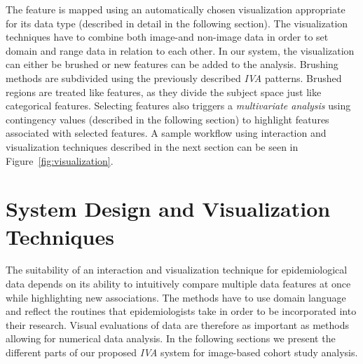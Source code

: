 \documentclass[journal]{style/vgtc} 			          %
\begin{document}
%
The feature is mapped using an automatically chosen visualization appropriate for its data type (described in detail in the following section).
%
The visualization techniques have to combine both image-and non-image data in order to set domain and range data in relation to each other.
%
In our system, the visualization can either be brushed or new features can be added to the analysis. 
%
Brushing methods are subdivided using the previously described \emph{IVA} patterns.
%
Brushed regions are treated like features, as they divide the subject space just like categorical features.
%
Selecting features also triggers a \emph{multivariate analysis} using contingency values (described in the following section) to highlight features associated with selected features.
%
A sample workflow using interaction and visualization techniques described in the next section can be seen in Figure~\ref{fig:visualization}.

\section{System Design and Visualization Techniques} \label{Interaction- and Visualization Techniques}
%
The suitability of an interaction and visualization technique for epidemiological data depends on its ability to intuitively compare multiple data features at once while highlighting new associations.
%
The methods have to use domain language and reflect the routines that epidemiologists take in order to be incorporated into their research.
%
Visual evaluations of data are therefore as important as methods allowing for numerical data analysis.
%
In the following sections we present the different parts of our proposed \emph{IVA} system for image-based cohort study analysis.
\end{document}
